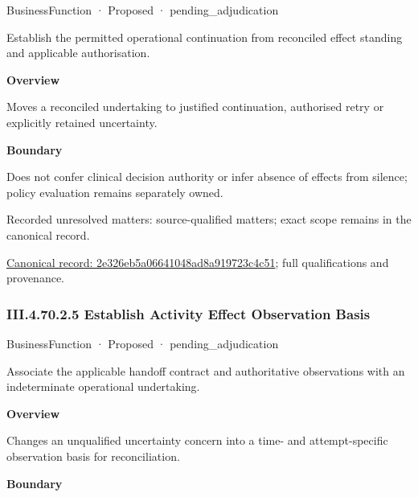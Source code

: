 \label{element:2e326eb5a06641048ad8a919723c4c51}
{\small BusinessFunction · Proposed · pending\_adjudication}\par

Establish the permitted operational continuation from reconciled effect standing and applicable authorisation.



\textbf{Overview}



Moves a reconciled undertaking to justified continuation, authorised retry or explicitly retained uncertainty.



\textbf{Boundary}



Does not confer clinical decision authority or infer absence of effects from silence; policy evaluation remains separately owned.


{\small Recorded unresolved matters: source-qualified matters; exact scope remains in the canonical record.}\par
{\footnotesize \href{../../../../continuum/business/business-function/2e326eb5a06641048ad8a919723c4c51.md}{Canonical record: 2e326eb5a06641048ad8a919723c4c51}; full qualifications and provenance.}\par
\subsubsection*{III.4.70.2.5 Establish Activity Effect Observation Basis}
\label{navigation:III.4.70.2.5}

\label{element:4038dd6a1baa4856afc76d7adfa6a457}
{\small BusinessFunction · Proposed · pending\_adjudication}\par

Associate the applicable handoff contract and authoritative observations with an indeterminate operational undertaking.



\textbf{Overview}



Changes an unqualified uncertainty concern into a time- and attempt-specific observation basis for reconciliation.



\textbf{Boundary}



